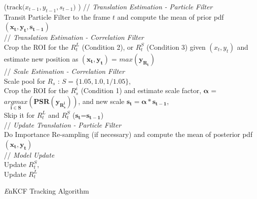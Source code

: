 \documentclass{bmvc2k}
\begin{document}
\begin{algorithm}[h]
\small
\DontPrintSemicolon
{}
\Begin($\text{track($x_{t-1},y_{t-1},s_{t-1}$) }$)
{
 	// \textit{Translation Estimation - Particle Filter} \\
	Transit Particle Filter to the frame $t$ and compute the mean of prior pdf $\mathbf{(x_{t},y_{t},s_{t-1})}$ \\
     // \textit{Translation Estimation - Correlation Filter} \\
	Crop the ROI for the $R_{t}^{L}$ (Condition 2), or $R_{t}^{S}$ (Condition 3) given $(x_{t},y_{t})$ and estimate new position as $\mathbf{(x_{t},y_{t})}$ = $\mathbf{\textit{max}(y_{R_{t}})}$\\
	// \textit{Scale Estimation - Correlation Filter}\\
	Scale pool for $R_{s}$ : $S = \lbrace1.05,1.0,1/1.05\rbrace$,\\
	Crop the ROI for the $R_{s}^{i}$ (Condition 1) and estimate scale factor, $\mathbf{\alpha}$ = $\mathbf{\underset{i\in S}{\textit{argmax}}(PSR(y_{R_{s}^{i}}))}$, and new scale $\mathbf{s_{t} = \alpha * s_{t-1}}$,\\ 
	Skip it for $R_{t}^{L}$ and $R_{t}^{S}$ ($\mathbf{s_{t}}$=$\mathbf{s_{t-1}}$)\\
	// \textit{Update Translation - Particle Filter}\\
	Do Importance Re-sampling (if necessary) and compute the 
	mean of posterior pdf $\mathbf{(x_{t},y_{t})}$\\
	// \textit{Model Update}\\
	Update $R_{t}^{S}$,\\
	Update $R_{t}^{L}$\\
  \label{endfor}
}
\caption{{\it E}nKCF Tracking Algorithm}\label{alg:MKCF}
\end{algorithm}
\end{document}
